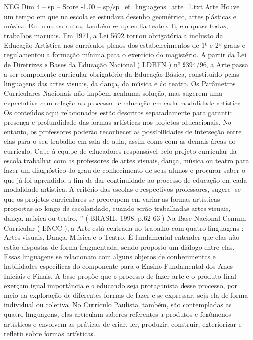 \begin{textsample}{NEG Dim 4 – sp – Score -1.00 – sp/sp\_ef\_linguagens\_arte\_1.txt}  \label{ex:f4_neg_037}
Arte Houve um tempo em que na escola se estudava desenho geométrico, artes plásticas e música.
Em uma ou outra, também se aprendia teatro.
E, em quase todas, trabalhos manuais.
Em 1971, a Lei 5692 tornou obrigatória a inclusão da Educação Artística nos currículos plenos dos estabelecimentos de 1º e 2º graus e regulamentou a formação mínima para o exercício do magistério.
A partir da Lei de Diretrizes e Bases da Educação Nacional ( LDBEN ) n{\EmojiFont °} 9394/96, a Arte passa a ser componente curricular obrigatório da Educação Básica, constituído pelas linguagens das artes visuais, da dança, da música e do teatro.
Os Parâmetros Curriculares Nacionais não impõem nenhuma solução, mas sugerem uma expectativa com relação ao processo de educação em cada modalidade artística.
Os conteúdos aqui relacionados estão descritos separadamente para garantir presença e profundidade das formas artísticas nos projetos educacionais.
No entanto, os professores poderão reconhecer as possibilidades de interseção entre elas para o seu trabalho em sala de aula, assim como com as demais áreas do currículo.
Cabe à equipe de educadores responsável pelo projeto curricular da escola trabalhar com os professores de artes visuais, dança, música ou teatro para fazer um diagnóstico do grau de conhecimento de seus alunos e procurar saber o que já foi aprendido, a fim de dar continuidade ao processo de educação em cada modalidade artística.
A critério das escolas e respectivos professores, sugere -se que os projetos curriculares se preocupem em variar as formas artísticas propostas ao longo da escolaridade, quando serão trabalhadas artes visuais, dança, música ou teatro. ” ( BRASIL, 1998. p.62-63 ) Na Base Nacional Comum Curricular ( BNCC ), a Arte está centrada no trabalho com quatro linguagens : Artes visuais, Dança, Música e o Teatro.
É fundamental entender que elas não estão dispostas de forma fragmentada, sendo proposto um diálogo entre elas.
Essas linguagens se relacionam com alguns objetos de conhecimentos e habilidades específicas do componente para o Ensino Fundamental dos Anos Iniciais e Finais.
A base propõe que o processo de fazer arte e o produto final exerçam igual importância e o educando seja protagonista desse processo, por meio da exploração de diferentes formas de fazer e se expressar, seja ela de forma individual ou coletiva.
No Currículo Paulista, também, são contempladas as quatro linguagens, elas articulam saberes referentes a produtos e fenômenos artísticos e envolvem as práticas de criar, ler, produzir, construir, exteriorizar e refletir sobre formas artísticas.

\end{textsample}
